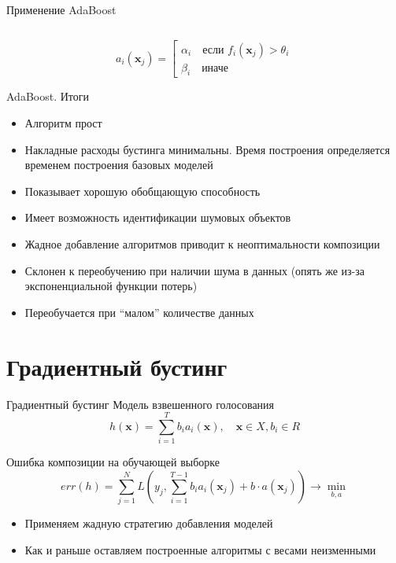 \documentclass[10pt]{beamer}
\begin{document}
\begin{frame}{Применение AdaBoost}
\begin{columns}[C]
\begin{column}{.5\textwidth}
\begin{center}
        \end{center}
    \end{column}
\end{columns}
\[
    a_i(\mathbf{x}_j) = \left[ \begin{array}{c} \alpha_{i} \quad \text{если}
            \,\, 
            f_i(\mathbf{x}_j) > \theta_i \\ 
            \beta_i \quad \text{иначе}
                               \end{array} \right. 
\]
\end{frame}

\begin{frame}{AdaBoost. Итоги}
\begin{itemize}
    \item[\color{green}\ding{52}] Алгоритм прост
    \item[\color{green}\ding{52}] Накладные расходы бустинга минимальны. Время
    построения определяется временем построения базовых моделей
    \item[\color{green}\ding{52}] Показывает хорошую обобщающую способность
    \item[\color{green}\ding{52}] Имеет возможность идентификации шумовых объектов
    \item[\color{red}\ding{54}] Жадное добавление алгоритмов приводит к
    неоптимальности композиции
    \item[\color{red}\ding{54}] Склонен к переобучению при наличии шума в данных
    (опять же из-за экспоненциальной функции потерь)
    \item[\color{red}\ding{54}] Переобучается при ``малом'' количестве данных
\end{itemize}


\end{frame}

\section{Градиентный бустинг}

\begin{frame}{Градиентный бустинг}
Модель взвешенного голосования
\[
    h(\mathbf{x}) = \sum \limits _{i=1}^T b_i a_i(\mathbf{x}), \quad \mathbf{x}
    \in X, b_i \in R
\]

\vspace{1em}
Ошибка композиции на обучающей выборке
\[
    err(h) = \sum \limits _{j=1}^N L(y_j, \sum \limits _{i=1}^{T-1} b_i
    a_i(\mathbf{x}_j)  + b \cdot a(\mathbf{x}_j)) \rightarrow \min \limits_{b,a}
\]

\vspace{1em}
\begin{itemize}
    \item Применяем жадную стратегию добавления моделей
    \item Как и раньше оставляем построенные алгоритмы с весами неизменными
\end{itemize}
\end{frame}
\end{document}
